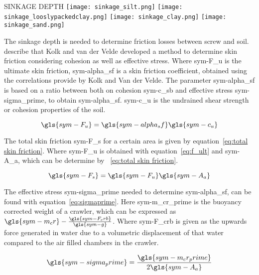 \begin{RoyalFigure}[!htb, label=fig:sinkage depths]{SINKAGE DEPTH}
    \texttt{[image: sinkage\_silt.png]}
    \texttt{[image: sinkage\_looslypackedclay.png]}
    \texttt{[image: sinkage\_clay.png]}
    \texttt{[image: sinkage\_sand.png]}
\end{RoyalFigure}

The sinkage depth is needed to determine friction losses between screw and soil. \citet{rajapakse_geotechnical_2011}
describe that Kolk and van der Velde developed a method to determine skin friction considering cohesion as well as
effective stress. Where \gls{sym-F_u} is the ultimate skin friction, \gls{sym-alpha_sf} is a skin friction coefficient,
obtained using the correlations provide by Kolk and Van der Velde. The parameter \gls{sym-alpha_sf} is based on a ratio
between both on cohesion \gls{sym-c_sb} and effective stress \gls{sym-sigma_prime}, to obtain \gls{sym-alpha_sf}.
\gls{sym-c_u} is the undrained shear strength or cohesion properties of the soil.

\begin{equation}
    \label{eq:f_ult}
    \gls{sym-F_u} = \gls{sym-alpha_sf} \gls{sym-c_u}
\end{equation}

\noindent The total skin friction \gls{sym-F_s} for a certain area is given by equation~\ref{eq:total skin friction}.
Where \gls{sym-F_u} is obtained with equation~\ref{eq:f_ult} and  \gls{sym-A_a}, which can be determine by~
\ref{eq:total skin friction}.

\begin{equation}
    \label{eq:total skin friction}
    \gls{sym-F_s}  = \gls{sym-F_u} \gls{sym-A_a}
\end{equation}

\noindent The effective stress \gls{sym-sigma_prime} needed to determine  \gls{sym-alpha_sf}, can be found with
equation~\ref{eq:sigmaprime}. Here \gls{sym-m_cr_prime} is the buoyancy corrected weight of a crawler, which can be
expressed as \( \gls{sym-m_cr} - \frac{\gls{sym-F_crb}}{\gls{sym-g}} \). Where \gls{sym-F_crb} is given as the upwards
force generated in water due to a volumetric displacement of that water compared to the air filled chambers in the
crawler.

\begin{equation}
    \label{eq:sigmaprime}
    \gls{sym-sigma_prime} = \frac{\gls{sym-m_cr_prime}}{2 \gls{sym-A_a} }
\end{equation}

